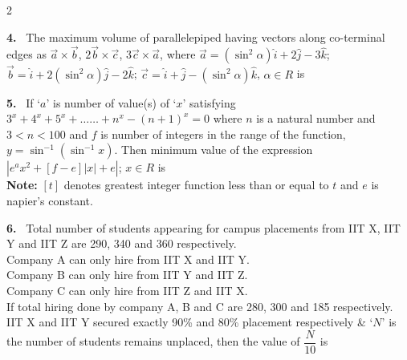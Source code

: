 \documentclass[10pt]{extarticle}
\newcommand{\qn}[1]{\par\smallskip\noindent\textbf{#1.}~}
\begin{document}
\begin{multicols}{2}
\qn{4} The maximum volume of parallelepiped having vectors along co-terminal edges as $\vec a\times\vec b$, $2\vec b\times\vec c$, $3\vec c\times\vec a$, where $\vec a=(\sin^2\alpha)\hat i+2\hat j-3\hat k$; $\vec b=\hat i+2(\sin^2\alpha)\hat j-2\hat k$; $\vec c=\hat i+\hat j-(\sin^2\alpha)\hat k$, $\alpha\in R$ is

\qn{5} If `$a$' is number of value(s) of `$x$' satisfying $3^x+4^x+5^x+\ldots\ldots+n^x-(n+1)^x=0$ where $n$ is a natural number and $3<n<100$ and $f$ is number of integers in the range of the function, $y=\sin^{-1}(\sin^{-1}x)$. Then minimum value of the expression $\left|e^ax^2+[f-e]|x|+e\right|$; $x\in R$ is\\
\textbf{Note:} $[t]$ denotes greatest integer function less than or equal to $t$ and $e$ is napier's constant.

\qn{6} Total number of students appearing for campus placements from IIT X, IIT Y and IIT Z are 290, 340 and 360 respectively.\\
Company A can only hire from IIT X and IIT Y.\\
Company B can only hire from IIT Y and IIT Z.\\
Company C can only hire from IIT Z and IIT X.\\
If total hiring done by company A, B and C are 280, 300 and 185 respectively.\\
IIT X and IIT Y secured exactly 90\% and 80\% placement respectively \& `$N$' is the number of students remains unplaced, then the value of $\dfrac{N}{10}$ is
\end{multicols}
\end{document}
